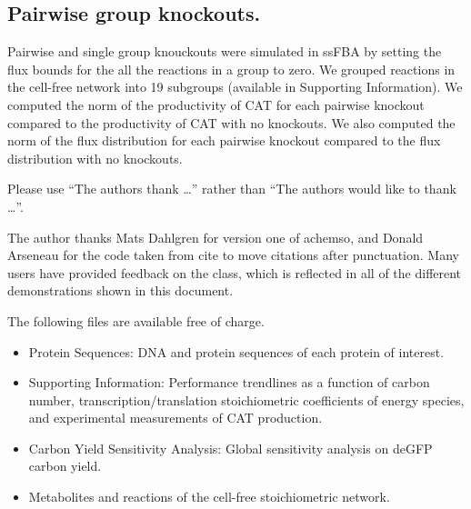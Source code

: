 \documentclass[journal=asbcd6,manuscript=article]{achemso}
\begin{document}
\subsection*{Pairwise group knockouts.}
Pairwise and single group knouckouts were simulated in ssFBA by setting the flux bounds for the all the reactions in a group to zero. 
We grouped reactions in the cell-free network into 19 subgroups (available in Supporting Information).
We computed the norm of the productivity of CAT for each pairwise knockout compared to the productivity of CAT with no knockouts.
We also computed the norm of the flux distribution for each pairwise knockout compared to the flux distribution with no knockouts.
\begin{acknowledgement}

Please use ``The authors thank \ldots'' rather than ``The
authors would like to thank \ldots''.

The author thanks Mats Dahlgren for version one of \textsf{achemso},
and Donald Arseneau for the code taken from \textsf{cite} to move
citations after punctuation. Many users have provided feedback on the
class, which is reflected in all of the different demonstrations
shown in this document.

\end{acknowledgement}

\begin{suppinfo}
The following files are available free of charge.
\begin{itemize}
  \item Protein Sequences: DNA and protein sequences of each protein of interest.
  \item Supporting Information: Performance trendlines as a function of carbon number, transcription/translation stoichiometric coefficients of energy species, and experimental measurements of CAT production.
  \item Carbon Yield Sensitivity Analysis: Global sensitivity analysis on deGFP carbon yield.
  \item Metabolites and reactions of the cell-free stoichiometric network.
\end{itemize}
\end{suppinfo}

\clearpage


\end{document}

